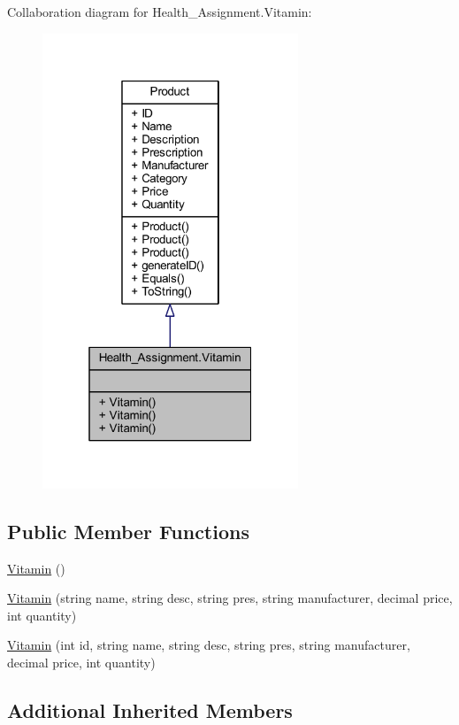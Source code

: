 Collaboration diagram for Health\+\_\+\+Assignment.\+Vitamin\+:\nopagebreak
\begin{figure}[H]
\begin{center}
\leavevmode
\includegraphics[width=217pt]{class_health___assignment_1_1_vitamin__coll__graph}
\end{center}
\end{figure}
\subsection*{Public Member Functions}
\begin{DoxyCompactItemize}
\item 
\hyperlink{class_health___assignment_1_1_vitamin_a4f36d90edd7b60b56bb5e53900162741}{Vitamin} ()
\item 
\hyperlink{class_health___assignment_1_1_vitamin_a4018fe1b748172becd54adb3a08a023f}{Vitamin} (string name, string desc, string pres, string manufacturer, decimal price, int quantity)
\item 
\hyperlink{class_health___assignment_1_1_vitamin_a380b2f315ccd72cadc454c3a3ab9407f}{Vitamin} (int id, string name, string desc, string pres, string manufacturer, decimal price, int quantity)
\end{DoxyCompactItemize}
\subsection*{Additional Inherited Members}


